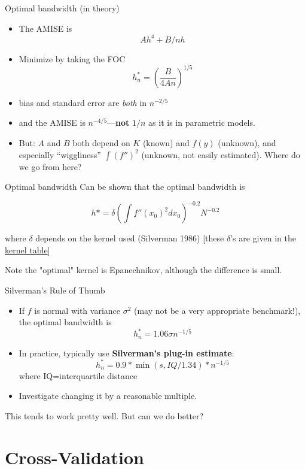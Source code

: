 \documentclass[11pt, aspectratio=169]{beamer}
\begin{document}
\begin{frame}{Optimal bandwidth (in theory)}
  \begin{itemize}
  \item The AMISE is $$Ah^4+B/nh$$
  \item Minimize by taking the FOC 
    $$h^*_n=\left(\frac{B}{4An}\right)^{1/5}$$
  
  \item bias and standard error are \emph{both} in $n^{-2/5}$
  \item and the AMISE is $n^{-4/5}$---{\bf not} $1/n$ as it is in parametric models.
  
  \item But: $A$ and $B$ both depend on $K$ (known) and $f(y)$ (unknown), and
  especially ``wiggliness''
  $\int (f'')^2$ (unknown, not easily estimated). Where do we go from here? 
  \end{itemize}
\end{frame}

\begin{frame}{Optimal bandwidth}
  Can be shown that the optimal bandwidth is 
  
  $$h* = \delta \left( \int f''(x_0)^2dx_0\right)^{-0.2}N^{-0.2} $$

  where $\delta$ depends on the kernel used (Silverman 1986) [these $\delta$'s are given in the \href{fig:kernels}{kernel table}]

  Note the "optimal" kernel is Epanechnikov, although the difference is small. 

\end{frame}

\begin{frame}{Silverman's Rule of Thumb}
  \begin{itemize}
  \item If $f$ is normal with variance $\sigma^2$ (may not be a very appropriate benchmark!), the optimal bandwidth
  is
  $$h^*_n=1.06 \sigma n^{-1/5}$$
  \item In practice, typically use \textbf{Silverman's plug-in estimate}:
  $$h^*_n=0.9*\min(s,IQ/1.34)*n^{-1/5}$$ 
  where IQ=interquartile distance
  \item Investigate changing it by a reasonable multiple.
  \end{itemize}
\pause
  This tends to work pretty well. But can we do better? 
\end{frame}

\section{Cross-Validation}
\end{document}
